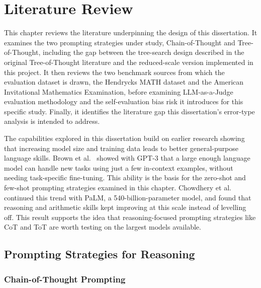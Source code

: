 \chapter{Literature Review}
\label{chap:literature}

This chapter reviews the literature underpinning the design of this
dissertation. It examines the two prompting strategies under study,
Chain-of-Thought and Tree-of-Thought, including the gap between the
tree-search design described in the original Tree-of-Thought literature
and the reduced-scale version implemented in this project. It then reviews
the two benchmark sources from which the evaluation dataset is drawn, the
Hendrycks MATH dataset and the American Invitational Mathematics
Examination, before examining LLM-as-a-Judge evaluation methodology and
the self-evaluation bias risk it introduces for this specific study.
Finally, it identifies the literature gap this dissertation's error-type
analysis is intended to address.

The capabilities explored in this dissertation build on earlier research
showing that increasing model size and training data leads to better
general-purpose language skills. Brown et al.~\cite{brown2020fewshot}
showed with GPT-3 that a large enough language model can handle new
tasks using just a few in-context examples, without needing
task-specific fine-tuning. This ability is the basis for the zero-shot
and few-shot prompting strategies examined in this chapter. Chowdhery et
al.~\cite{chowdhery2022palm} continued this trend with PaLM, a
540-billion-parameter model, and found that reasoning and arithmetic
skills kept improving at this scale instead of levelling off. This
result supports the idea that reasoning-focused prompting strategies
like CoT and ToT are worth testing on the largest models available.

\section{Prompting Strategies for Reasoning}
\subsection{Chain-of-Thought Prompting}

